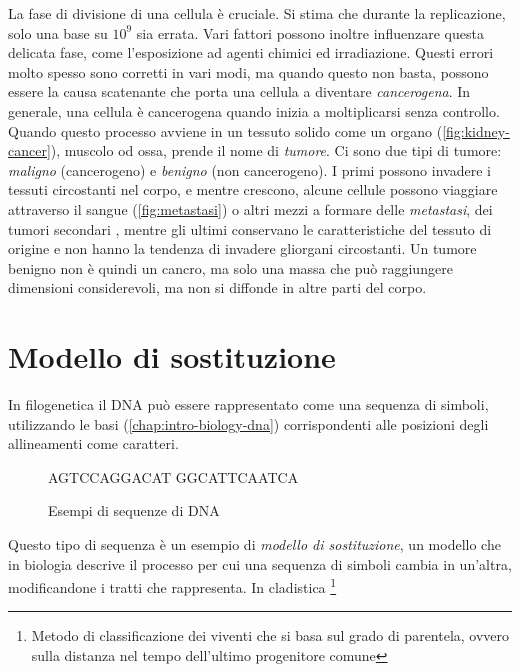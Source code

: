 La fase di divisione di una cellula è cruciale. Si stima che durante la replicazione, solo una base su $10^9$ \cite{DNAReplication} sia errata. Vari fattori possono inoltre influenzare questa delicata fase, come l'esposizione ad agenti chimici ed irradiazione. Questi errori molto spesso sono corretti in vari modi, ma quando questo non basta, possono essere la causa scatenante che porta una cellula a diventare \textit{cancerogena}. In generale, una cellula è cancerogena quando inizia a moltiplicarsi senza controllo. Quando questo processo avviene in un tessuto solido come un organo (\autoref{fig:kidney-cancer}), muscolo od ossa, prende il nome di \textit{tumore}. Ci sono due tipi di tumore: \textit{maligno} (cancerogeno) e \textit{benigno} (non cancerogeno). I primi possono invadere i tessuti circostanti nel corpo, e mentre crescono, alcune cellule possono viaggiare attraverso il sangue (\autoref{fig:metastasi}) o altri mezzi a formare delle \textit{metastasi}, dei tumori secondari \cite{differencecancertumor:online}, mentre gli ultimi conservano le caratteristiche del tessuto di origine e non hanno la tendenza di invadere gliorgani circostanti. Un tumore benigno non è quindi un cancro, ma solo una massa che può raggiungere dimensioni considerevoli, ma non si diffonde in altre parti del corpo.

\section{Modello di sostituzione}
\label{chap:intro-models}

In filogenetica il DNA può essere rappresentato come una sequenza di simboli, utilizzando le basi (\autoref{chap:intro-biology-dna}) corrispondenti alle posizioni degli allineamenti come caratteri.
\begin{figure}[h]
    \centering
    AGTCCAGGACAT \qquad GGCATTCAATCA
    \caption{Esempi di sequenze di DNA}
    \label{fig:dna-sequence}
\end{figure}

Questo tipo di sequenza è un esempio di \textit{modello di sostituzione}, un modello che in biologia descrive il processo per cui una sequenza di simboli cambia in un'altra, modificandone i tratti che rappresenta. In cladistica \footnote{Metodo di classificazione dei viventi che si basa sul grado di parentela, ovvero sulla distanza nel tempo dell'ultimo progenitore comune}